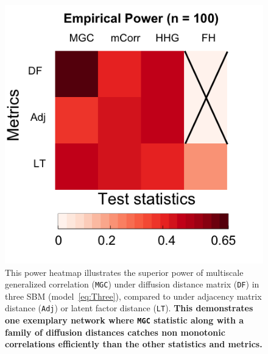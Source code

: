 \documentclass[12pt]{article}
\theoremstyle{definition}
\begin{document}
\begin{figure}
	\centering
	\includegraphics[width=0.4\paperwidth, height=0.4\paperwidth]{../../Figure/ThreeSBM_results_simple.png}
	\caption{This power heatmap illustrates the superior power of multiscale generalized correlation (\texttt{MGC}) under diffusion distance matrix (\texttt{DF}) in three SBM (model~\ref{eq:Three}), compared to under adjacency matrix distance (\texttt{Adj}) or latent factor distance (\texttt{LT}). \textbf{This demonstrates one exemplary network where \texttt{MGC} statistic along with a family of diffusion distances catches non monotonic correlations efficiently than the other statistics and metrics.}}
	\label{fig:threeSBM}
\end{figure}
\end{document}

